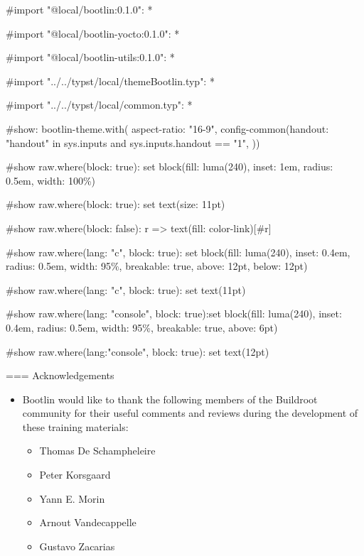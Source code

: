 #import "@local/bootlin:0.1.0": *

#import "@local/bootlin-yocto:0.1.0": *

#import "@local/bootlin-utils:0.1.0": *

#import "../../typst/local/themeBootlin.typ": *

#import "../../typst/local/common.typ": *

#show: bootlin-theme.with( aspect-ratio: "16-9", config-common(handout: "handout" in sys.inputs and sys.inputs.handout == "1", ))

#show raw.where(block: true): set block(fill: luma(240), inset: 1em, radius: 0.5em, width: 100\%)

#show raw.where(block: true): set text(size: 11pt)

#show raw.where(block: false): r => text(fill: color-link)[#r]

#show raw.where(lang: "c", block: true): set block(fill: luma(240), inset: 0.4em, radius: 0.5em, width: 95\%, breakable: true, above: 12pt, below: 12pt)

#show raw.where(lang: "c", block: true): set text(11pt)

#show raw.where(lang: "console", block: true):set block(fill: luma(240), inset: 0.4em, radius: 0.5em, width: 95\%, breakable: true, above: 6pt)

#show raw.where(lang:"console", block: true): set text(12pt)

=== {Acknowledgements}

  \begin{itemize}

  \item Bootlin would like to thank the following members of
    the Buildroot community for their useful comments and reviews
    during the development of these training materials:
    \begin{itemize}
    \item Thomas De Schampheleire
    \item Peter Korsgaard
    \item Yann E. Morin
    \item Arnout Vandecappelle
    \item Gustavo Zacarias
    \end{itemize}
  \end{itemize}


